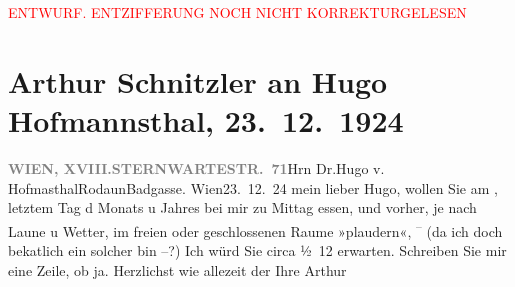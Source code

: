 
\begin{center}
            \textcolor{red}{ENTWURF. ENTZIFFERUNG NOCH NICHT KORREKTURGELESEN}
                      \end{center}
            
               \section[Arthur Schnitzler an Hugo Hofmannsthal, 23. 12. 1924]{ Arthur Schnitzler an Hugo Hofmannsthal, 23. 12. 1924}\nopagebreak{}\rehead{ }\begin{ledgroupsized}[t]{13cm}\normalsize\beginnumbering{} \toendnotes[C]{\smallbreak\pagebreak[2]} 
\toendnotes[C]{\smallbreak}\pstart{}{\pb}\label{T_L02424-1v}\label{T_L02424-1h}\pend{}\pstart{}\textcolor{gray}{\textbf{WIEN, XVIII.}}\pend{}\pstart{}\textcolor{gray}{\textbf{STERNWARTESTR. 71}}\pend{}{\bigskip}\pstart{}Hrn Dr.\pend{}\pstart{}Hugo v. Hofma{\geminationn}sthal\pend{}\pstart{}Rodaun\pend{}\pstart{}Badgasse.\pend{}{\bigskip}\pstart
           \raggedleft{}{\pb}Wien23. 12. 24\pend
           \pstart
           mein lieber Hugo, wollen Sie am \label{K_L02424_1v}\label{K_L02424_1h}, letztem Tag d Monats u Jahres bei mir zu Mittag essen, und vorher, je nach Laune u
               Wetter, im freien oder geschlossenen Raume »plaudern«, \substVorne{}\textsuperscript{– }\substDazwischen{}(\substHinten{}da ich doch beka{\geminationn}tlich ein solcher bin –?) Ich
               würd {\pb}Sie circa ½ 12 erwarten. Schreiben Sie
               mir eine Zeile, ob ja. Herzlichst wie allezeit der Ihre\pend
           \pstart \spacefill\mbox{Arthur}\pend{}\endnumbering{}\end{ledgroupsized}  \newcommand{\dateiname}{L02424}\newcommand{\titel}{Arthur Schnitzler an Hugo Hofmannsthal, 23. 12. 1924}\newcommand{\editorInnen}{Martin Anton Müller und Gerd-Hermann Susen}
      